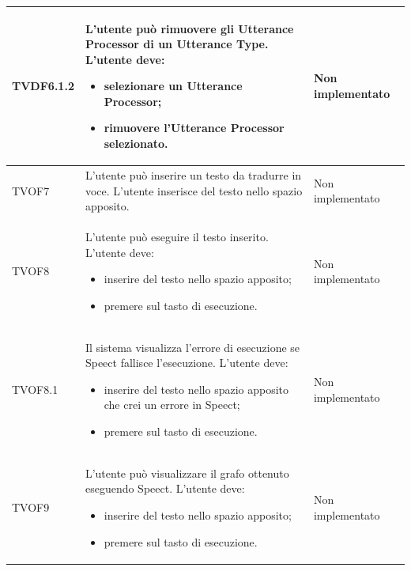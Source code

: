 \documentclass[openany,12pt,a4paper]{report}
\begin{document}
\begin{longtable}{| p{2cm} |p{5cm} | p{2.5cm} |}
	\newline TVDF6.1.2&
	\newline L'utente può rimuovere gli Utterance Processor di un Utterance Type. L'utente deve:
	\begin{itemize}
		\item selezionare un Utterance Processor;
		\item rimuovere l'Utterance Processor selezionato.
	\end{itemize}&
	\newline Non implementato
	\\[1em]
	\hline	
	
	\newline TVOF7&
	\newline L'utente può inserire un testo da tradurre in voce. L'utente inserisce del testo nello spazio apposito.&
	\newline Non implementato
	\\[1em]
	
	\hline
	\newline TVOF8&
	\newline L'utente può eseguire il testo inserito. L'utente deve:
	\begin{itemize}
		\item inserire del testo nello spazio apposito;
		\item premere sul tasto di esecuzione.
	\end{itemize}&
	\newline Non implementato
	\\[1em]
	\hline
	\newline TVOF8.1&
	\newline Il sistema visualizza l'errore di esecuzione se Speect fallisce l'esecuzione. L'utente deve:
	\begin{itemize}
		\item inserire del testo nello spazio apposito che crei un errore in Speect;
		\item premere sul tasto di esecuzione.
	\end{itemize}&
	\newline Non implementato
	\\[1em]
	\hline
	
	\newline TVOF9&
	\newline L'utente può visualizzare il grafo ottenuto eseguendo Speect. L'utente deve:
	\begin{itemize}
		\item inserire del testo nello spazio apposito;
		\item premere sul tasto di esecuzione.
	\end{itemize}&
	\newline Non implementato
	\\[1em]
	\hline
	

\end{longtable}
\end{document}
